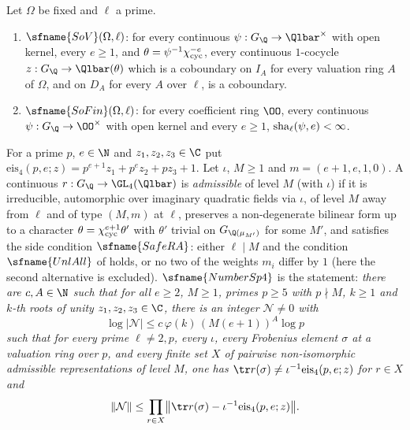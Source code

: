 \begin{definition}\label{pf:modularity:so}
Let $\Omega$ be fixed and $\ell$ a prime.
\begin{enumerate}[label=(\alph*)]
\item $\sfname{SoV}(\Omega,\ell)$: for every continuous $\psi:G_\Q\to\Qlbar^\times$ with open kernel, every $e\ge1$, and
$\theta=\psi^{-1}\chi_{\mathrm{cyc}}^{-e}$, every continuous $1$-cocycle $z:G_\Q\to\Qlbar(\theta)$ which is a coboundary on
$I_A$ for every valuation ring $A$ of $\Omega$, and on $D_A$ for every $A$ over $\ell$, is a coboundary.
\item $\sfname{SoFin}(\Omega,\ell)$: for every coefficient ring $\OO$, every continuous $\psi:G_\Q\to\OO^\times$ with
open kernel and every $e\ge1$, $\mathrm{sha}_\ell(\psi,e)<\infty$.
\end{enumerate}
\end{definition}

\begin{definition}\label{pf:modularity:number}
For a prime $p$, $e\in\N$ and $z_1,z_2,z_3\in\C$ put $\mathrm{eis}_4(p,e;z)=p^{e+1}z_1+p^ez_2+pz_3+1$. Let $\iota$,
$M\ge1$ and $m=(e+1,e,1,0)$. A continuous $r:G_\Q\to\GL_4(\Qlbar)$ is \emph{admissible} of level $M$ (with
$\iota$) if it is irreducible, automorphic over imaginary quadratic fields via $\iota$, of level $M$ away from $\ell$
and of type $(M,m)$ at $\ell$, preserves a non-degenerate bilinear form up to a
character $\theta=\chi_{\mathrm{cyc}}^{e+1}\theta'$ with $\theta'$ trivial on $G_{\Q(\mu_{M'})}$ for some $M'$, and
satisfies the side condition $\sfname{SafeRA}$: either $\ell\mid M$ and the condition $\sfname{UnlAll}$ of
\cite{LeanSource2026} holds, or no two of the weights $m_i$ differ by $1$ (here the second alternative is excluded).
$\sfname{NumberSp4}$ is the statement: \emph{there are $c,A\in\N$ such that for all $e\ge2$, $M\ge1$, primes $p\ge5$
with $p\nmid M$, $k\ge1$ and $k$-th roots of unity $z_1,z_2,z_3\in\C$, there is an integer $\mathcal N\ne0$ with
\[
 \log|\mathcal N|\le c\,\varphi(k)\,(M(e+1))^A\log p
\]
such that for every prime $\ell\ne2,p$, every $\iota$, every Frobenius element $\sigma$ at a valuation ring over $p$,
and every finite set $X$ of pairwise non-isomorphic admissible representations of level $M$, one has
$\tr r(\sigma)\ne\iota^{-1}\mathrm{eis}_4(p,e;z)$ for $r\in X$ and
\[
 \|\mathcal N\|\le\prod_{r\in X}\bigl\|\tr r(\sigma)-\iota^{-1}\mathrm{eis}_4(p,e;z)\bigr\|.
\]}
\end{definition}

